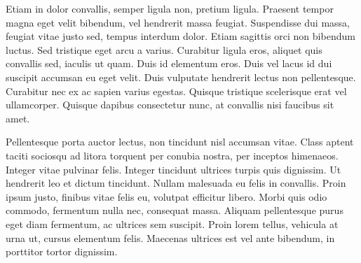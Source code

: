 \documentclass[12pt]{article}
\begin{document}
Etiam in dolor convallis, semper ligula non, pretium ligula. Praesent tempor magna eget velit bibendum, vel hendrerit massa feugiat. Suspendisse dui massa, feugiat vitae justo sed, tempus interdum dolor. Etiam sagittis orci non bibendum luctus. Sed tristique eget arcu a varius. Curabitur ligula eros, aliquet quis convallis sed, iaculis ut quam. Duis id elementum eros. Duis vel lacus id dui suscipit accumsan eu eget velit. Duis vulputate hendrerit lectus non pellentesque. Curabitur nec ex ac sapien varius egestas. Quisque tristique scelerisque erat vel ullamcorper. Quisque dapibus consectetur nunc, at convallis nisi faucibus sit amet.

Pellentesque porta auctor lectus, non tincidunt nisl accumsan vitae. Class aptent taciti sociosqu ad litora torquent per conubia nostra, per inceptos himenaeos. Integer vitae pulvinar felis. Integer tincidunt ultrices turpis quis dignissim. Ut hendrerit leo et dictum tincidunt. Nullam malesuada eu felis in convallis. Proin ipsum justo, finibus vitae felis eu, volutpat efficitur libero. Morbi quis odio commodo, fermentum nulla nec, consequat massa. Aliquam pellentesque purus eget diam fermentum, ac ultrices sem suscipit. Proin lorem tellus, vehicula at urna ut, cursus elementum felis. Maecenas ultrices est vel ante bibendum, in porttitor tortor dignissim.
\end{document}
